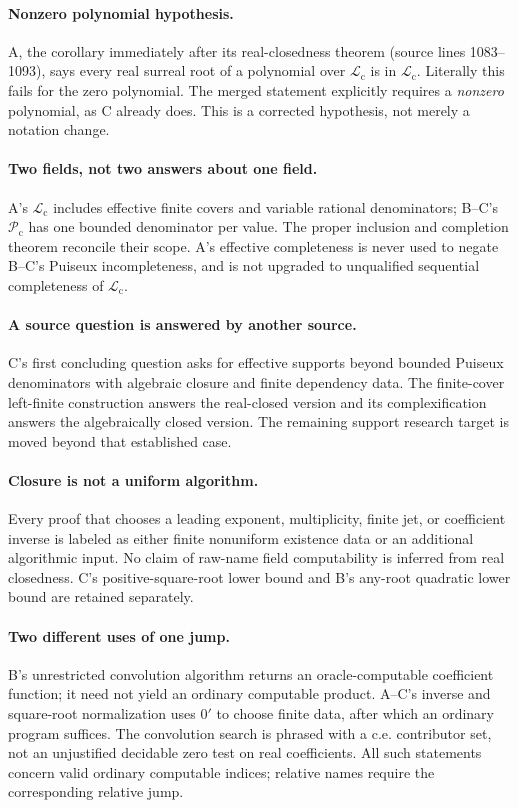 \documentclass[11pt,letterpaper]{article}
\numberwithin{equation}{section}
\theoremstyle{definition}
\theoremstyle{remark}
\newcommand{\Lc}{\mathcal L_{\mathrm c}}
\newcommand{\Pc}{\mathcal P_{\mathrm c}}
\begin{document}
\paragraph{Nonzero polynomial hypothesis.}
A, the corollary immediately after its real-closedness theorem (source lines
1083--1093), says every real surreal root of a polynomial over $\Lc$ is in
$\Lc$. Literally this fails for the zero polynomial. The merged statement
explicitly requires a \emph{nonzero} polynomial, as C already does. This is a
corrected hypothesis, not merely a notation change.

\paragraph{Two fields, not two answers about one field.}
A's $\Lc$ includes effective finite covers and variable rational denominators;
B--C's $\Pc$ has one bounded denominator per value. The proper inclusion and
completion theorem reconcile their scope. A's effective completeness is
never used to negate B--C's Puiseux incompleteness, and is not upgraded to
unqualified sequential completeness of $\Lc$.

\paragraph{A source question is answered by another source.}
C's first concluding question asks for effective supports beyond bounded
Puiseux denominators with algebraic closure and finite dependency data.
The finite-cover left-finite construction answers the real-closed version
and its complexification answers the algebraically closed version. The
remaining support research target is moved beyond that established case.

\paragraph{Closure is not a uniform algorithm.}
Every proof that chooses a leading exponent, multiplicity, finite jet, or
coefficient inverse is labeled as either finite nonuniform existence data
or an additional algorithmic input. No claim of raw-name field computability
is inferred from real closedness. C's positive-square-root lower bound and
B's any-root quadratic lower bound are retained separately.

\paragraph{Two different uses of one jump.}
B's unrestricted convolution algorithm returns an oracle-computable
coefficient function; it need not yield an ordinary computable product.
A--C's inverse and square-root normalization uses $0'$ to choose finite data,
after which an ordinary program suffices. The convolution search is phrased
with a c.e. contributor set, not an unjustified decidable zero test on real
coefficients. All such statements concern valid ordinary computable indices;
relative names require the corresponding relative jump.
\end{document}
